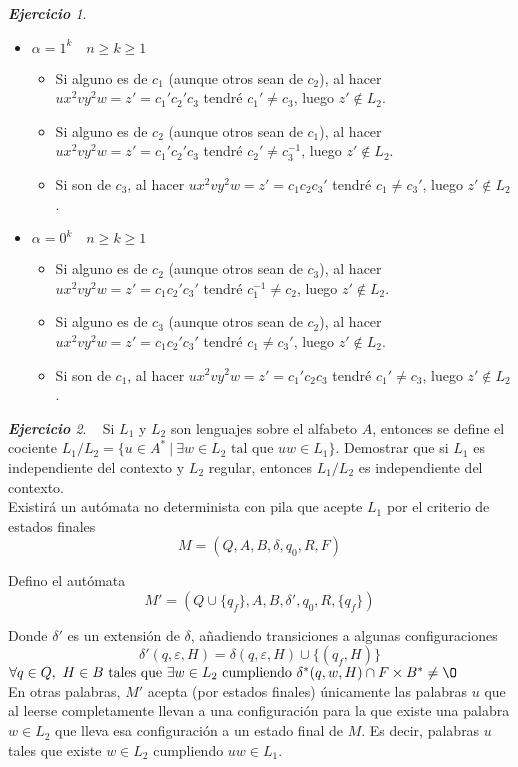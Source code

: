 \documentclass[12pt,spanish]{article}
\theoremstyle{definition}
\theoremstyle{remark}
\newtheorem{exercise}{\textbf{Ejercicio}}%
\begin{document}
\begin{exercise}
\begin{itemize}
  \item $\alpha = 1^k \quad n \geq k\geq 1$
    \begin{itemize}
    \item Si alguno es de $c_1$ (aunque otros sean de $c_2$), al hacer
      $ux^2vy^2w=z'=c_1'c_2'c_3$ tendré $c_1'\neq c_3$, luego
      $z' \notin L_2$.
    \item Si alguno es de $c_2$ (aunque otros sean de $c_1$), al hacer
      $ux^2vy^2w=z'=c_1'c_2'c_3$ tendré $c_2'\neq c_3^{-1}$, luego
      $z' \notin L_2$.
    \item Si son de $c_3$, al hacer $ux^2vy^2w=z'=c_1c_2c_3'$ tendré
      $c_1\neq c_3'$, luego $z' \notin L_2$.
    \end{itemize}

    \item $\alpha = 0^k \quad n \geq k\geq 1$
    \begin{itemize}
    \item Si alguno es de $c_2$ (aunque otros sean de $c_3$), al hacer
      $ux^2vy^2w=z'=c_1c_2'c_3'$ tendré $c_1^{-1}\neq c_2$, luego
      $z' \notin L_2$.
    \item Si alguno es de $c_3$ (aunque otros sean de $c_2$), al hacer
      $ux^2vy^2w=z'=c_1c_2'c_3'$ tendré $c_1\neq c_3'$, luego
      $z' \notin L_2$.
    \item Si son de $c_1$, al hacer $ux^2vy^2w=z'=c_1'c_2c_3$ tendré
      $c_1'\neq c_3$, luego $z' \notin L_2$.
    \end{itemize}
  \end{itemize}
\end{exercise}

\newpage

\setcounter{exercise}{20}

\begin{exercise}~ Si $L_1$ y $L_2$ son lenguajes sobre el alfabeto
  $A$, entonces se define el cociente
  $L_1/L_2=\{u\in A^*\ |\ \exists w \in L_2 \text{ tal que } uw \in
  L_1\}$. Demostrar que si $L_1$ es independiente del contexto y $L_2$
  regular, entonces $L_1/L_2$ es independiente del contexto. \\

  Existirá un autómata no determinista con pila que acepte $L_1$ por
  el criterio de estados finales
  \[M=(Q, A, B, \delta, q_0, R, F)\]

  Defino el autómata
  \[M'=(Q\cup\{q_f\}, A, B, \delta', q_0, R, \{q_f\})\]

  Donde $\delta'$ es un extensión de $\delta$, añadiendo transiciones
  a algunas configuraciones
  \[\delta'(q, \varepsilon, H)=\delta(q, \varepsilon, H)\cup\{(q_f,
    H)\}\]
  $\forall q\in Q,\ H \in B \text{ tales que } \exists w \in L_2
  \text{ cumpliendo } \delta^*(q, w, H)\cap F\times B^* \neq \O$ \\

  En otras palabras, $M'$ acepta (por estados finales) únicamente las
  palabras $u$ que al leerse completamente llevan a una configuración
  para la que existe una palabra $w \in L_2$ que lleva esa
  configuración a un estado final de $M$. Es decir, palabras $u$ tales
  que existe $w \in L_2$ cumpliendo $uw\in L_1$.
\end{exercise}
\end{document}

